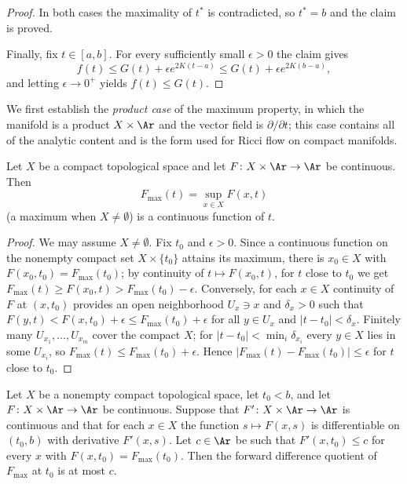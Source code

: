 \begin{proof}
In both cases the maximality of $t^*$ is contradicted, so $t^*=b$
and the claim is proved.

Finally, fix $t\in[a,b]$. For every sufficiently small $\epsilon>0$
the claim gives
$$f(t)\le G(t)+\epsilon e^{2K(t-a)}\le G(t)+\epsilon e^{2K(b-a)},$$
and letting $\epsilon\rightarrow0^+$ yields $f(t)\le G(t)$.
\end{proof}


We first establish the {\em product case} of the maximum property, in
which the manifold is a product $X\times\Ar$ and the vector field is
$\partial/\partial t$; this case contains all of the analytic content
and is the form used for Ricci flow on compact manifolds.

\begin{lemma}
\label{lem:max-function-continuous-product}
\leanok
Let $X$ be a compact topological space and let $F\colon X\times\Ar\to
\Ar$ be continuous. Then
$$F_{\mathrm{max}}(t)=\sup_{x\in X}F(x,t)$$
(a maximum when $X\not=\emptyset$) is a continuous function of $t$.
\end{lemma}

\begin{proof}
\leanok
We may assume $X\not=\emptyset$. Fix $t_0$ and $\epsilon>0$. Since a
continuous function on the nonempty compact set $X\times\{t_0\}$
attains its maximum, there is $x_0\in X$ with
$F(x_0,t_0)=F_{\mathrm{max}}(t_0)$; by continuity of $t\mapsto
F(x_0,t)$, for $t$ close to $t_0$ we get
$F_{\mathrm{max}}(t)\ge F(x_0,t)>F_{\mathrm{max}}(t_0)-\epsilon$.
Conversely, for each $x\in X$ continuity of $F$ at $(x,t_0)$ provides
an open neighborhood $U_x\ni x$ and $\delta_x>0$ such that
$F(y,t)<F(x,t_0)+\epsilon\le F_{\mathrm{max}}(t_0)+\epsilon$ for all
$y\in U_x$ and $|t-t_0|<\delta_x$. Finitely many $U_{x_1},\dots,
U_{x_m}$ cover the compact $X$; for $|t-t_0|<
\min_i\delta_{x_i}$ every $y\in X$ lies in some $U_{x_i}$, so
$F_{\mathrm{max}}(t)\le F_{\mathrm{max}}(t_0)+\epsilon$. Hence
$|F_{\mathrm{max}}(t)-F_{\mathrm{max}}(t_0)|\le\epsilon$ for $t$
close to $t_0$.
\end{proof}

\begin{lemma}
\label{lem:forward-difference-maximum-product}
\leanok
{}
Let $X$ be a nonempty compact topological space, let $t_0<b$, and let
$F\colon X\times\Ar\to\Ar$ be continuous. Suppose that $F'\colon
X\times\Ar\to\Ar$ is continuous and that for each $x\in X$ the
function $s\mapsto F(x,s)$ is differentiable on $(t_0,b)$ with
derivative $F'(x,s)$. Let $c\in\Ar$ be such that $F'(x,t_0)\le c$ for
every $x$ with $F(x,t_0)=F_{\mathrm{max}}(t_0)$. Then the forward
difference quotient of $F_{\mathrm{max}}$ at $t_0$ is at most $c$.
\end{lemma}

